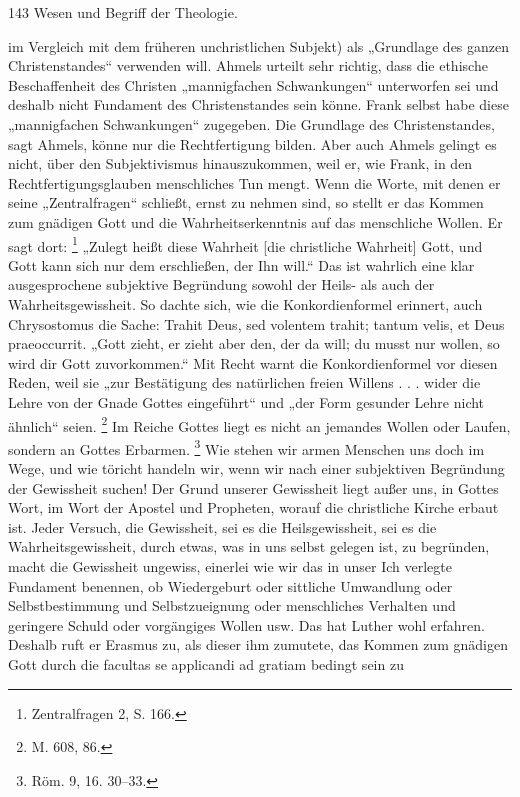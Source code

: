 143 Wesen und Begriff der Theologie.\par\par\setcounter{footnote}{491}im Vergleich mit dem früheren unchristlichen Subjekt) als „Grundlage des ganzen Christenstandes“ verwenden will. Ahmels urteilt sehr richtig, dass die ethische Beschaffenheit des Christen „mannigfachen Schwankungen“ unterworfen sei und deshalb nicht Fundament des Christenstandes sein könne. Frank selbst habe diese „mannigfachen Schwankungen“ zugegeben. Die Grundlage des Christenstandes, sagt Ahmels, könne nur die Rechtfertigung bilden. Aber auch Ahmels gelingt es nicht, über den Subjektivismus hinauszukommen, weil er, wie Frank, in den Rechtfertigungsglauben menschliches Tun mengt. Wenn die Worte, mit denen er seine „Zentralfragen“ schließt, ernst zu nehmen sind, so stellt er das Kommen zum gnädigen Gott und die Wahrheitserkenntnis auf das menschliche Wollen. Er sagt dort: \footnote{Zentralfragen 2, S. 166.} „Zulegt heißt diese Wahrheit [die christliche Wahrheit] Gott, und Gott kann sich nur dem erschließen, der Ihn will.“ Das ist wahrlich eine klar ausgesprochene subjektive Begründung sowohl der Heils- als auch der Wahrheitsgewissheit. So dachte sich, wie die Konkordienformel erinnert, auch Chrysostomus die Sache: Trahit Deus, sed volentem trahit; tantum velis, et Deus praeoccurrit. „Gott zieht, er zieht aber den, der da will; du musst nur wollen, so wird dir Gott zuvorkommen.“ Mit Recht warnt die Konkordienformel vor diesen Reden, weil sie „zur Bestätigung des natürlichen freien Willens . . . wider die Lehre von der Gnade Gottes eingeführt“ und „der Form gesunder Lehre nicht ähnlich“ seien. \footnote{M. 608, 86.} Im Reiche Gottes liegt es nicht an jemandes Wollen oder Laufen, sondern an Gottes Erbarmen. \footnote{Röm. 9, 16. 30--33.} Wie stehen wir armen Menschen uns doch im Wege, und wie töricht handeln wir, wenn wir nach einer subjektiven Begründung der Gewissheit suchen! Der Grund unserer Gewissheit liegt außer uns, in Gottes Wort, im Wort der Apostel und Propheten, worauf die christliche Kirche erbaut ist. Jeder Versuch, die Gewissheit, sei es die Heilsgewissheit, sei es die Wahrheitsgewissheit, durch etwas, was in uns selbst gelegen ist, zu begründen, macht die Gewissheit ungewiss, einerlei wie wir das in unser Ich verlegte Fundament benennen, ob Wiedergeburt oder sittliche Umwandlung oder Selbstbestimmung und Selbstzueignung oder menschliches Verhalten und geringere Schuld oder vorgängiges Wollen usw. Das hat Luther wohl erfahren. Deshalb ruft er Erasmus zu, als dieser ihm zumutete, das Kommen zum gnädigen Gott durch die facultas se applicandi ad gratiam bedingt sein zu
